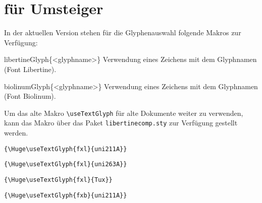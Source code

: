 \documentclass[ngerman]{libertinedoku}
\begin{document}

\section{für Umsteiger}

In der aktuellen Version stehen für die Glyphenauswahl folgende Makros zur Verfügung:

\begin{eqlist}
\item [libertineGlyph\{<glyphname>\}] Verwendung eines Zeichens mit dem Glyphnamen (Font Libertine).
\item [biolinumGlyph\{<glyphname>\}] Verwendung eines Zeichens mit dem Glyphnamen (Font Biolinum).
\end{eqlist}

Um das alte Makro \verb|\useTextGlyph| für alte Dokumente weiter zu verwenden, kann das
Makro über das Paket \texttt{libertinecomp.sty} zur Verfügung gestellt werden.

\begin{minipage}{10cm}
\verb|{\Huge\useTextGlyph{fxl}{uni211A}}| \hfill {\Huge{}} \par
\verb|{\Huge\useTextGlyph{fxl}{uni263A}}| \hfill {\Huge{}} \par
\verb|{\Huge\useTextGlyph{fxl}{Tux}}| \hfill {\Huge{}} \par

\bigskip
\verb|{\Huge\useTextGlyph{fxb}{uni211A}}| \hfill {\Huge{}} \par
\end{minipage}
\end{document}
